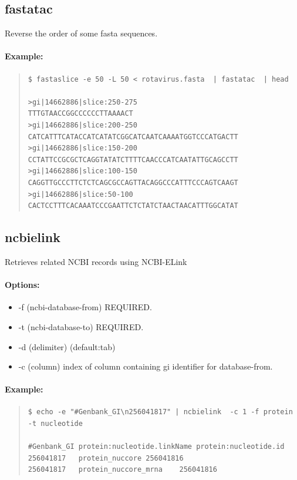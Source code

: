 \documentclass[12pt]{article}
\begin{document}
\subsection{fastatac}
Reverse the order of some fasta sequences.
\paragraph{Example:}
\begin{quote}
\begin{verbatim}
$ fastaslice -e 50 -L 50 < rotavirus.fasta  | fastatac  | head

>gi|14662886|slice:250-275
TTTGTAACCGGCCCCCCTTAAAACT
>gi|14662886|slice:200-250
CATCATTTCATACCATCATATCGGCATCAATCAAAATGGTCCCATGACTT
>gi|14662886|slice:150-200
CCTATTCCGCGCTCAGGTATATCTTTTCAACCCATCAATATTGCAGCCTT
>gi|14662886|slice:100-150
CAGGTTGCCCTTCTCTCAGCGCCAGTTACAGGCCCATTTCCCAGTCAAGT
>gi|14662886|slice:50-100
CACTCCTTTCACAAATCCCGAATTCTCTATCTAACTAACATTTGGCATAT
\end{verbatim}
\end{quote}

\subsection{ncbielink}
Retrieves related NCBI records using NCBI-ELink
\paragraph{Options:}
\begin{itemize}
\item-f (ncbi-database-from) REQUIRED.
\item-t (ncbi-database-to) REQUIRED.
\item-d (delimiter) (default:tab)
\item-c (column) index of column containing gi identifier for database-from.
\end{itemize}
\paragraph{Example:}
\begin{quote}
\begin{verbatim}
$ echo -e "#Genbank_GI\n256041817" | ncbielink  -c 1 -f protein -t nucleotide

#Genbank_GI	protein:nucleotide.linkName	protein:nucleotide.id
256041817	protein_nuccore	256041816
256041817	protein_nuccore_mrna	256041816
\end{verbatim}
\end{quote}
\end{document}
